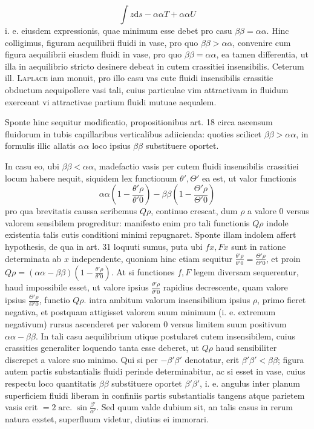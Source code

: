 %
\[
\int z\mathrm{d}s-\alpha\alpha T+\alpha\alpha U
\]
i. e. eiusdem expressionis, quae minimum esse debet pro casu $\beta\beta=\alpha\alpha$. Hinc colligimus, figuram aequilibrii fluidi in vase, pro quo $\beta\beta>\alpha\alpha$, convenire cum figura aequilibrii eiusdem fluidi in vase, pro quo $\beta\beta=\alpha\alpha$, ea tamen differentia, ut illa in aequilibrio stricto desinere debeat in cutem crassitiei insensibilis. Ceterum ill. \textsc{Laplace} iam monuit, pro illo casu vas cute fluidi insensibilis crassitie obductum aequipollere vasi tali, cuius particulae vim attractivam in fluidum exerceant vi attractivae partium fluidi mutuae aequalem.

Sponte hinc sequitur modificatio, propositionibus art. 18 circa ascensum fluidorum in tubis capillaribus verticalibus adiicienda: quoties scilicet $\beta\beta>\alpha\alpha$, in formulis illic allatis $\alpha\alpha$ loco ipsius $\beta\beta$ substituere oportet.

In casu eo, ubi $\beta\beta<\alpha\alpha$, madefactio vasis per cutem fluidi insensibilis crassitiei locum habere nequit, siquidem lex functionum $\theta',\Theta'$ ea est, ut valor functionis
\[
\alpha\alpha\left(1-\frac{\theta'\rho}{\theta'0}\right)-\beta\beta\left(1-\frac{\Theta'\rho}{\Theta'0}\right)
\]
pro qua brevitatis caussa scribemus $Q\rho$, continuo crescat, dum $\rho$ a valore $0$ versus valorem sensibilem progreditur: manifesto enim pro tali functionis $Q\rho$ indole existentia talis cutis conditioni minimi repugnaret. Sponte illam indolem affert hypothesis, de qua in art. 31 loquuti sumus, puta ubi $fx,Fx$ sunt in ratione determinata ab $x$ independente, quoniam hinc etiam sequitur $\frac{\theta'\rho}{\theta'0}=\frac{\Theta'\rho}{\Theta'0}$, et proin $Q\rho=(\alpha\alpha-\beta\beta)(1-\frac{\theta'\rho}{\theta'0})$. At si functiones $f,F$ legem diversam sequerentur, haud impossibile esset, ut valore ipsius $\frac{\theta'\rho}{\theta'0}$ rapidius decrescente, quam valore ipsius $\frac{\Theta'\rho}{\Theta'0}$, functio $Q\rho$. intra ambitum valorum insensibilium ipsius $\rho$, primo fieret negativa, et postquam attigisset valorem suum minimum (i. e. extremum negativum) rursus ascenderet per valorem $0$ versus limitem suum positivum $\alpha\alpha-\beta\beta$. In tali casu aequilibrium utique postularet cutem insensibilem, cuius crassities generaliter loquendo tanta esse deberet, ut $Q\rho$ haud sensibiliter discrepet a valore suo minimo. Qui si per $-\beta'\beta'$ denotatur, erit $\beta'\beta'<\beta\beta$; figura autem partis substantialis fluidi perinde determinabitur, ac si esset in vase, cuius respectu loco quantitatis $\beta\beta$ substituere oportet $\beta'\beta'$, i. e. angulus inter planum
superficiem fluidi liberam in confiniis partis substantialis tangens atque parietem vasis erit $=2\operatorname{arc.}\sin\frac{\beta'}{\alpha'}$. Sed quum valde dubium sit, an talis casus in rerum natura exstet, superfluum videtur, diutius ei immorari.

